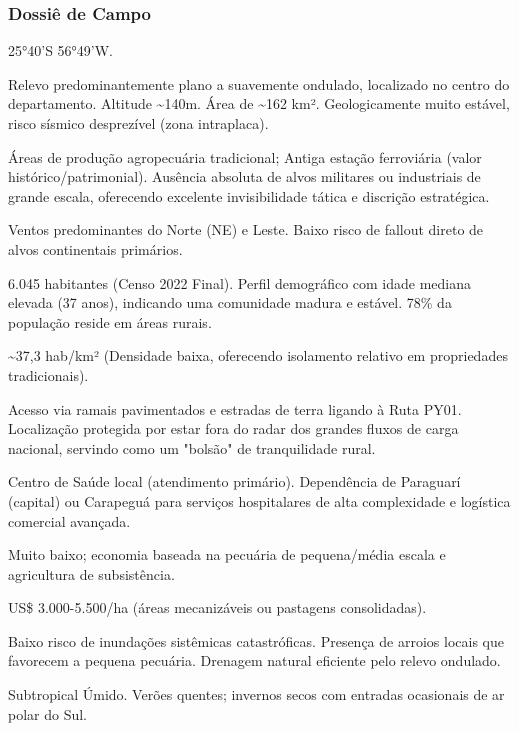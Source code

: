 \subsubsection{Dossiê de Campo}
\begin{description}[style=nextline,leftmargin=0.5cm,font=\bfseries]
\item[Coordenadas]  25°40'S 56°49'W.
\item[Topografia]  Relevo predominantemente plano a suavemente ondulado, localizado no centro do departamento. Altitude \textasciitilde 140m. Área de \textasciitilde 162 km². Geologicamente muito estável, risco sísmico desprezível (zona intraplaca).
\item[Alvos Estratégicos]  Áreas de produção agropecuária tradicional; Antiga estação ferroviária (valor histórico/\allowbreak patrimonial). Ausência absoluta de alvos militares ou industriais de grande escala, oferecendo excelente invisibilidade tática e discrição estratégica.
\item[Fallout]  Ventos predominantes do Norte (NE) e Leste. Baixo risco de fallout direto de alvos continentais primários.
\item[População]  6.045 habitantes (Censo 2022 Final). Perfil demográfico com idade mediana elevada (37 anos), indicando uma comunidade madura e estável. 78\% da população reside em áreas rurais.
\item[Densidade]  \textasciitilde 37,3 hab/\allowbreak km² (Densidade baixa, oferecendo isolamento relativo em propriedades tradicionais).
\item[Vias de Acesso]  Acesso via ramais pavimentados e estradas de terra ligando à Ruta PY01. Localização protegida por estar fora do radar dos grandes fluxos de carga nacional, servindo como um "bolsão" de tranquilidade rural.
\item[Serviços]  Centro de Saúde local (atendimento primário). Dependência de Paraguarí (capital) ou Carapeguá para serviços hospitalares de alta complexidade e logística comercial avançada.
\item[Custo de Vida]  Muito baixo; economia baseada na pecuária de pequena/\allowbreak média escala e agricultura de subsistência.
\item[Preço da Terra]  US\$ 3.000-5.500/\allowbreak ha (áreas mecanizáveis ou pastagens consolidadas).
\item[Hidrologia]  Baixo risco de inundações sistêmicas catastróficas. Presença de arroios locais que favorecem a pequena pecuária. Drenagem natural eficiente pelo relevo ondulado.
\item[Clima]  Subtropical Úmido. Verões quentes; invernos secos com entradas ocasionais de ar polar do Sul.

\end{description}
